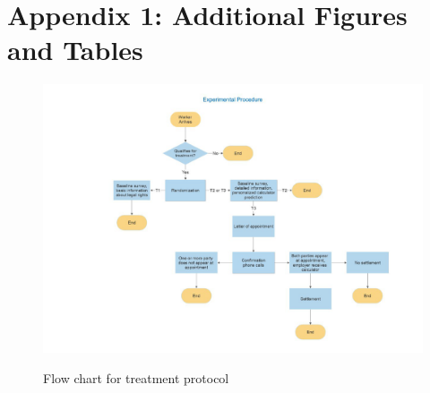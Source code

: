 \section*{Appendix 1: Additional Figures and Tables}

\begin{figure}[!htbp] 
    \caption{Flow chart for treatment protocol}
    \centering
    \includegraphics[width=1\textwidth]{Figures/A1_flowchart.png}
    \label{fig:A1_1}
\end{figure}
